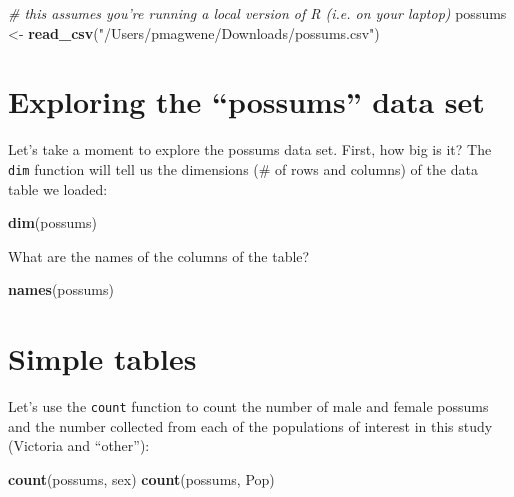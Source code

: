 \documentclass[]{book}
\newenvironment{Shaded}{\begin{snugshade}}{\end{snugshade}}
\newcommand{\CommentTok}[1]{\textcolor[rgb]{0.56,0.35,0.01}{\textit{#1}}}
\newcommand{\KeywordTok}[1]{\textcolor[rgb]{0.13,0.29,0.53}{\textbf{#1}}}
\newcommand{\NormalTok}[1]{#1}
\newcommand{\StringTok}[1]{\textcolor[rgb]{0.31,0.60,0.02}{#1}}
\theoremstyle{definition}
\theoremstyle{definition}
\theoremstyle{definition}
\theoremstyle{remark}
\begin{document}
\begin{Shaded}
\begin{Highlighting}[]
\CommentTok{# this assumes you're running a local version of R (i.e. on your laptop)}
\NormalTok{possums <-}\StringTok{ }\KeywordTok{read_csv}\NormalTok{(}\StringTok{"/Users/pmagwene/Downloads/possums.csv"}\NormalTok{)}
\end{Highlighting}
\end{Shaded}

\hypertarget{exploring-the-possums-data-set}{%
\section{Exploring the ``possums'' data
set}\label{exploring-the-possums-data-set}}

Let's take a moment to explore the possums data set. First, how big is
it? The \texttt{dim} function will tell us the dimensions (\# of rows
and columns) of the data table we loaded:

\begin{Shaded}
\begin{Highlighting}[]
\KeywordTok{dim}\NormalTok{(possums)}
\end{Highlighting}
\end{Shaded}

What are the names of the columns of the table?

\begin{Shaded}
\begin{Highlighting}[]
\KeywordTok{names}\NormalTok{(possums)}
\end{Highlighting}
\end{Shaded}

\hypertarget{simple-tables}{%
\section{Simple tables}\label{simple-tables}}

Let's use the \texttt{count} function to count the number of male and
female possums and the number collected from each of the populations of
interest in this study (Victoria and ``other''):

\begin{Shaded}
\begin{Highlighting}[]
\KeywordTok{count}\NormalTok{(possums, sex)}
\KeywordTok{count}\NormalTok{(possums, Pop)}
\end{Highlighting}
\end{Shaded}
\end{document}
